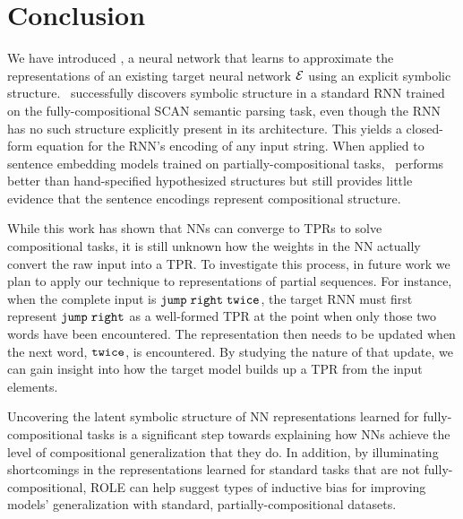 \section{Conclusion} \label{sec:Conclusion}

We have introduced \RLN, a neural network that learns to approximate the representations of an existing target neural network ${\mathcal{E}}$ using an explicit symbolic structure. \RLN\ successfully discovers symbolic structure in a standard RNN trained on the fully-compositional SCAN semantic parsing task, even though the RNN has no such structure explicitly present in its architecture. This yields a closed-form equation for the RNN's encoding of any input string. 
When applied to sentence embedding models trained on partially-compositional tasks, \RLN\ performs better than hand-specified hypothesized structures but still provides little evidence that the sentence encodings represent compositional structure. 

While this work has shown that NNs can converge to TPRs to solve compositional tasks, it is still unknown how the weights in the NN actually convert the raw input into a TPR. To investigate this process, in future work we plan to apply our technique to representations of partial sequences. For instance, when the complete input is \textcolor{violet}{${\mathtt{jump \hspace{1mm} right \hspace{1mm} twice}}$}, the target RNN must first represent \textcolor{violet}{${\mathtt{jump \hspace{1mm} right}}$} as a well-formed TPR at the point when only those two words have been encountered. The representation then needs to be updated when the next word, \textcolor{violet}{${\mathtt{twice}}$}, is encountered. By studying the nature of that update, we can gain insight into how the target model builds up a TPR from the input elements.



Uncovering the latent symbolic structure of NN representations learned for fully-compositional tasks is a significant step towards explaining how NNs achieve the level of compositional generalization that they do. In addition, by illuminating shortcomings in the representations learned for standard tasks that are not fully-compositional, ROLE can help suggest types of inductive bias for improving models' generalization with standard, partially-compositional datasets.